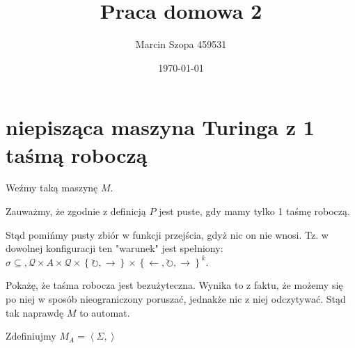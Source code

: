 \documentclass{article}
\title{Praca domowa 2}
\author{Marcin Szopa 459531}
\date{\today}
\theoremstyle{definition}
\theoremstyle{remark}
\begin{document}
\maketitle

\section{niepisząca maszyna Turinga z 1 taśmą roboczą}

Weźmy taką maszynę \(M\).

Zauważmy, że zgodnie z definicją \(P\) jest puste, gdy mamy tylko 1 taśmę roboczą.

Stąd pomińmy pusty zbiór w funkcji przejścia, gdyż nic on nie wnosi. Tz. w dowolnej konfiguracji ten "warunek" jest spełniony: \(\sigma \subseteq, \mathcal{Q} \times A \times \mathcal{Q} \times \left\{ \circlearrowright,  \rightarrow  \right\} \times \left\{ \leftarrow, \circlearrowright,  \rightarrow  \right\}^k\).

Pokażę, że taśma robocza jest bezużyteczna. Wynika to z faktu, że możemy się po niej w sposób nieograniczony poruszać, jednakże nic z niej odczytywać. Stąd tak naprawdę \(M\) to automat.

Zdefiniujmy \(M_A = \left<\Sigma, \right>\)
\end{document}
